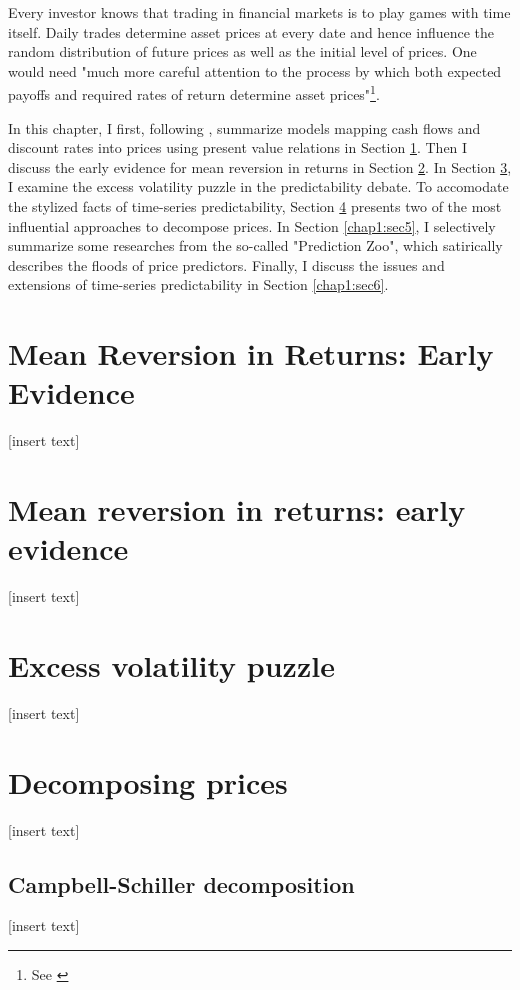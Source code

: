\minitoc

\vspace{0.5cm}
Every investor knows that trading in financial markets is to play
games with time itself. Daily trades determine asset prices at every date and hence
influence the random distribution of future prices as well as the initial
level of prices. One would need "much more careful attention to the process
by which both expected payoffs and required rates of return determine
asset prices"\footnote{See \citet[p.~121]{campbell2017financial}}.

In this chapter, I first, following \citet[Chapter~5]{campbell2017financial}, summarize models 
mapping cash flows and discount rates into prices using present value relations in Section \ref{chap1:sec1}.
Then I discuss the early evidence for mean reversion in returns in Section \ref{chap1:sec2}.
In Section \ref{chap1:sec3}, I examine the excess volatility puzzle in the predictability debate.
To accomodate the stylized facts of time-series predictability, Section \ref{chap1:sec4}
presents two of the most influential approaches to decompose prices. In Section \ref{chap1:sec5},
I selectively summarize some researches from the so-called "Prediction Zoo", which satirically 
describes the floods of price predictors. Finally, I discuss the issues and extensions of time-series
predictability in Section \ref{chap1:sec6}.

\section{Mean Reversion in Returns: Early Evidence}\label{chap1:sec1}
[insert text]

\section{Mean reversion in returns: early evidence}\label{chap1:sec2}
[insert text]

\section{Excess volatility puzzle}\label{chap1:sec3}
[insert text]

\section{Decomposing prices}\label{chap1:sec4}
[insert text]

\subsection{Campbell-Schiller decomposition}\label{chap1:sec4:ssec1}
[insert text]

